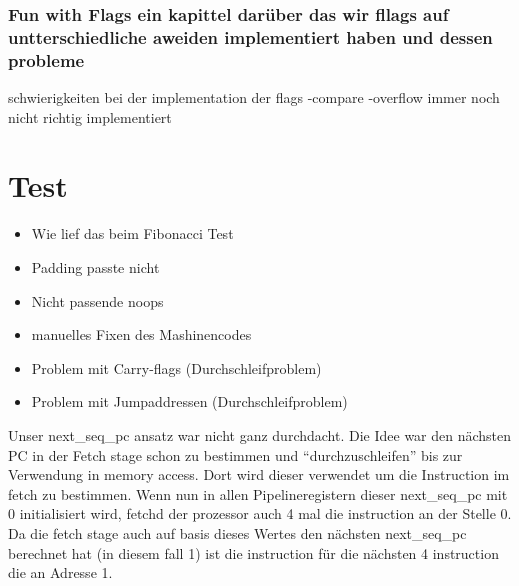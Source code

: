 \documentclass[paper=a4,fontsize=12pt]{scrreprt}
\begin{document}




\subsection{Fun with Flags ein kapittel darüber das wir fllags auf untterschiedliche aweiden implementiert haben und dessen probleme}

schwierigkeiten bei der implementation der flags 
-compare
-overflow immer noch nicht richtig implementiert





\chapter{Test}
\begin{itemize}
    \item Wie lief das beim Fibonacci Test
    \item Padding passte nicht
    \item Nicht passende noops
    \item manuelles Fixen des Mashinencodes
    \item Problem mit Carry-flags (Durchschleifproblem)
    \item Problem mit Jumpaddressen (Durchschleifproblem)
\end{itemize}

Unser next\_seq\_pc ansatz war nicht ganz durchdacht.
Die Idee war den nächsten PC in der Fetch stage schon zu bestimmen und \enquote{durchzuschleifen} bis zur Verwendung in memory access.
Dort wird dieser verwendet um die Instruction im fetch zu bestimmen.
Wenn nun in allen Pipelineregistern dieser next\_seq\_pc mit 0 initialisiert wird, fetchd der prozessor auch 4 mal die instruction an der Stelle 0.
Da die fetch stage auch auf basis dieses Wertes den nächsten next\_seq\_pc berechnet hat (in diesem fall 1) ist die instruction für die nächsten 4 instruction die an Adresse 1.
\end{document}
